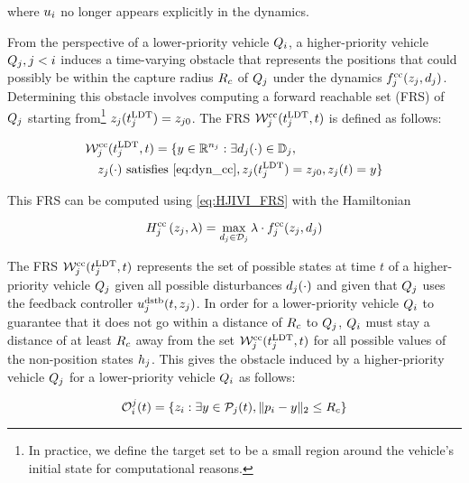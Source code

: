 \noindent where $u_i$ no longer appears explicitly in the dynamics.

From the perspective of a lower-priority vehicle $Q_i$, a higher-priority vehicle $Q_j, j < i$ induces a time-varying obstacle that represents the positions that could possibly be within the capture radius $R_c$ of $Q_j$ under the dynamics $f^\text{cc}_j(z_j, d_j)$. Determining this obstacle involves computing a forward reachable set (FRS) of $Q_j$ starting from\footnote{In practice, we define the target set to be a small region around the vehicle's initial state for computational reasons.} $z_j(t^\text{LDT}_j) = z_{j0}$. The FRS $\mathcal{W}_j^\text{cc}(t^\text{LDT}_j, t)$ is defined as follows:

\begin{equation}
\label{eq:FRS1}
\begin{aligned}
&\frs_j^\text{cc}(\ldt_j, t) = \{y \in \R^{n_j}: \exists \dstb_j(\cdot) \in \dfset_j, \\
&\quad\state_j(\cdot) \text{ satisfies \eqref{eq:dyn_cc}}, \state_j(\ldt_j) = \state_{j0}, \state_j(t) = y\}
\end{aligned}
\end{equation}

This FRS can be computed using \eqref{eq:HJIVI_FRS} with the Hamiltonian

\begin{equation}
H_j^\text{cc}\left(z_j, \lambda\right) = \max_{d_j \in \mathcal{D}_j} \lambda \cdot f^\text{cc}_j(z_j, d_j)
\end{equation}

The FRS $\mathcal{W}_j^\text{cc}(t^\text{LDT}_j, t)$ represents the set of possible states at time $t$ of a higher-priority vehicle $Q_j$ given all possible disturbances $d_j(\cdot)$ and given that $Q_j$ uses the feedback controller $u_j^\text{dstb}(t, z_j)$. In order for a lower-priority vehicle $Q_i$ to guarantee that it does not go within a distance of $R_c$ to $Q_j$, $Q_i$ must stay a distance of at least $R_c$ away from the set $\mathcal{W}_j^\text{cc}(t^\text{LDT}_j, t)$ for all possible values of the non-position states $h_j$. This gives the obstacle induced by a higher-priority vehicle $Q_j$ for a lower-priority vehicle $Q_i$ as follows:

\begin{equation} \label{eqn:ccObs}
\ioset_i^j(t) = \{\state_i: \exists y \in \pfrs_j(t), \|\pos_i - y\|_2 \le \rc \}
\end{equation}

